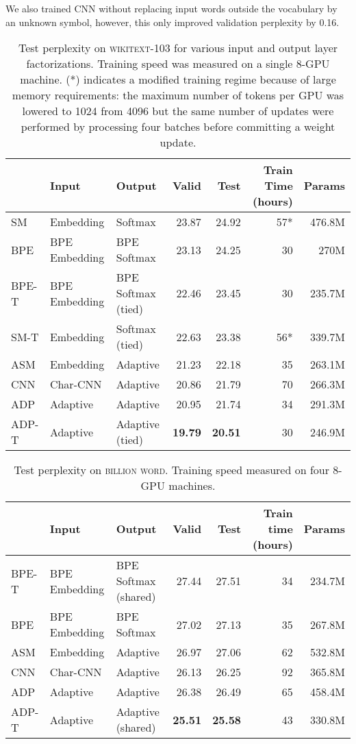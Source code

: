 \documentclass{article} \usepackage{iclr2019_conference,times}
\def\gbw{\textsc{billion word}}
\def\wiki{\textsc{wikitext-103}}
\def\cnn{\textsc{CNN}}
\begin{document}
We also trained \cnn{} without replacing input words outside the vocabulary by an unknown symbol, however, this only improved validation perplexity by 0.16.
\begin{table*}
\centering
\begin{tabular}{lllrrrr}
\toprule
& \bf Input & \bf Output & \bf Valid & \bf Test & \bf \thead{Train Time\\ (hours)} & \bf Params \\ \midrule
SM & Embedding & Softmax & 23.87 & 24.92 &57* & 476.8M \\ BPE & BPE Embedding & BPE Softmax & 23.13 & 24.25 & 30 & 270M \\ BPE-T & BPE Embedding & BPE Softmax (tied) & 22.46 & 23.45 & 30 & 235.7M \\ SM-T & Embedding & Softmax (tied) & 22.63 & 23.38 & 56* & 339.7M \\ ASM & Embedding & Adaptive & 21.23 & 22.18 & 35 & 263.1M \\ CNN & Char-CNN & Adaptive & 20.86 & 21.79 & 70 & 266.3M \\ ADP & Adaptive & Adaptive & 20.95 & 21.74 & 34 & 291.3M  \\ ADP-T & Adaptive & Adaptive (tied) & \bf 19.79 & \bf 20.51 & 30 & 246.9M \\
\bottomrule
\end{tabular}
\caption{Test perplexity on \wiki{} for various input and output layer factorizations. Training speed was measured on a single 8-GPU machine. (*) indicates a modified training regime because of large memory requirements: the maximum number of tokens per GPU was lowered to 1024 from 4096 but the same number of updates were performed by processing four batches before committing a weight update. 
}
\label{tab:wiki_comp}
\end{table*}

\begin{table*}
\centering
\begin{tabular}{lllrrrr}
\toprule
 & \bf Input & \bf Output & \bf Valid & \bf Test & \bf  \thead{Train time\\ (hours)} & \bf Params \\ \midrule
BPE-T & BPE Embedding & BPE Softmax (shared) & 27.44 & 27.51 & 34 & 234.7M \\
BPE & BPE Embedding & BPE Softmax & 27.02 & 27.13 & 35 & 267.8M \\
ASM & Embedding & Adaptive & 26.97 & 27.06 & 62 & 532.8M \\ CNN & Char-CNN & Adaptive & 26.13 & 26.25 & 92 & 365.8M \\
ADP & Adaptive & Adaptive & 26.38 & 26.49 & 65 & 458.4M \\
ADP-T & Adaptive & Adaptive (shared) & \bf 25.51 & \bf 25.58 & 43 & 330.8M \\
\bottomrule
\end{tabular}
\caption{Test perplexity on \gbw{}. Training speed measured on four 8-GPU machines. }
\label{tab:gbw_comp}
\end{table*}
\end{document}
